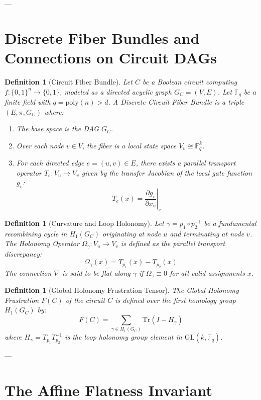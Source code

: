 \documentclass[11pt,a4paper]{article}
\newtheorem{definition}[theorem]{Definition}
\newcommand{\F}{\mathbb{F}}
\newcommand{\poly}{\mathrm{poly}}
\newcommand{\Tr}{\mathrm{Tr}}
\newcommand{\GL}{\mathrm{GL}}
\begin{document}
---

\section{Discrete Fiber Bundles and Connections on Circuit DAGs}

\begin{definition}[Circuit Fiber Bundle]
Let $C$ be a Boolean circuit computing $f: \{0,1\}^n \to \{0,1\}$, modeled as a directed acyclic graph $G_C = (V, E)$. Let $\F_q$ be a finite field with $q = \poly(n) > d$. A \emph{Discrete Circuit Fiber Bundle} is a triple $(E, \pi, G_C)$ where:
\begin{enumerate}
    \item The base space is the DAG $G_C$.
    \item Over each node $v \in V$, the fiber is a local state space $V_v \cong \F_q^k$.
    \item For each directed edge $e = (u,v) \in E$, there exists a parallel transport operator $T_e: V_u \to V_v$ given by the transfer Jacobian of the local gate function $g_v$:
    \[
    T_e(x) = \left. \frac{\partial g_v}{\partial x_u} \right|_{x}
    \]
\end{enumerate}
\end{definition}

\begin{definition}[Curvature and Loop Holonomy]
Let $\gamma = p_1 \circ p_2^{-1}$ be a fundamental recombining cycle in $H_1(G_C)$ originating at node $u$ and terminating at node $v$. The \emph{Holonomy Operator} $\Omega_\gamma: V_u \to V_v$ is defined as the parallel transport discrepancy:
\[
\Omega_\gamma(x) = T_{p_1}(x) - T_{p_2}(x)
\]
The connection $\nabla$ is said to be \emph{flat} along $\gamma$ if $\Omega_\gamma \equiv 0$ for all valid assignments $x$.
\end{definition}

\begin{definition}[Global Holonomy Frustration Tensor]
The \emph{Global Holonomy Frustration} $F(C)$ of the circuit $C$ is defined over the first homology group $H_1(G_C)$ by:
\[
F(C) = \sum_{\gamma \in H_1(G_C)} \Tr\left( I - H_\gamma \right)
\]
where $H_\gamma = T_{p_1} T_{p_2}^{-1}$ is the loop holonomy group element in $\GL(k, \F_q)$.
\end{definition}

---

\section{The Affine Flatness Invariant}
\end{document}
